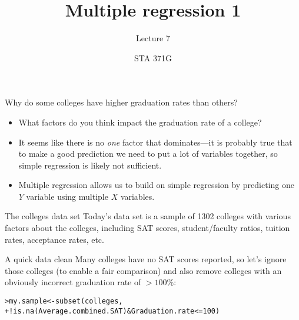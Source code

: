 \documentclass{beamer}\usepackage[]{graphicx}\usepackage[]{color}
\title{Multiple regression 1}
\subtitle{Lecture 7}
\author{STA 371G}
\makeatletter
\newcommand{\hlnum}[1]{\textcolor[rgb]{0.824,0.412,0.118}{#1}}%
\newcommand{\hlopt}[1]{\textcolor[rgb]{1,0.894,0.769}{#1}}%
\newcommand{\hlstd}[1]{\textcolor[rgb]{1,0.894,0.769}{#1}}%
\newcommand{\hlkwb}[1]{\textcolor[rgb]{0.804,0.776,0.451}{#1}}%
\newcommand{\hlkwd}[1]{\textcolor[rgb]{1,0.78,0.769}{#1}}%
\newenvironment{kframe}{%
 \def\at@end@of@kframe{}%
 \ifinner\ifhmode%
  \def\at@end@of@kframe{\end{minipage}}%
  \begin{minipage}{\columnwidth}%
 \fi\fi%
 \def\FrameCommand##1{\hskip\@totalleftmargin \hskip-\fboxsep
 \colorbox{shadecolor}{##1}\hskip-\fboxsep
     \hskip-\linewidth \hskip-\@totalleftmargin \hskip\columnwidth}%
 \MakeFramed {\advance\hsize-\width
   \@totalleftmargin\z@ \linewidth\hsize
   \@setminipage}}%
 {\par\unskip\endMakeFramed%
 \at@end@of@kframe}
\newenvironment{knitrout}{}{} %
\makeatother
\begin{document}
  
  

  \frame{\maketitle}



  \begin{darkframes}
    \begin{frame}{Why do some colleges have higher graduation rates than others?}
      \begin{itemize}[<+->]
        \item What factors do you think impact the graduation rate of a college?
        \item It seems like there is no \emph{one} factor that dominates---it is probably true that to make a good prediction we need to put a lot of variables together, so simple regression is likely not sufficient.
        \item \alert{Multiple regression} allows us to build on simple regression by predicting one $Y$ variable using multiple $X$ variables.
      \end{itemize}
    \end{frame}

    \begin{frame}{The colleges data set}
      Today's data set is a sample of 1302 colleges with various factors about the colleges, including SAT scores, student/faculty ratios, tuition rates, acceptance rates, etc.
    \end{frame}

    \begin{frame}[fragile]{A quick data clean}
      Many colleges have no SAT scores reported, so let's ignore those colleges (to enable a fair comparison) and also remove colleges with an obviously incorrect graduation rate of $>100\%$:
\begin{knitrout}
\begin{kframe}
\begin{alltt}
\hlstd{> }\hlstd{my.sample} \hlkwb{<-} \hlkwd{subset}\hlstd{(colleges,}
\hlstd{+ }  \hlopt{!}\hlkwd{is.na}\hlstd{(Average.combined.SAT)} \hlopt{&} \hlstd{Graduation.rate} \hlopt{<=} \hlnum{100}\hlstd{)}
\end{alltt}
\end{kframe}
\end{knitrout}
    \end{frame}


\end{darkframes}
\end{document}
